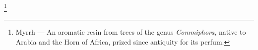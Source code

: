 \footnote{Myrrh — An aromatic resin from trees of the genus \textit{Commiphora}, native to Arabia and the Horn of Africa, prized since antiquity for its perfum.}